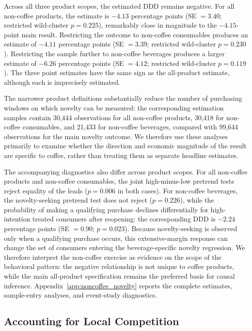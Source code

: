 \documentclass[11 pt]{article}
\begin{document}
Across all three product scopes, the estimated DDD remains negative. For all non-coffee products, the estimate is $-4.13$ percentage points (SE $=3.40$; restricted wild-cluster $p=0.225$), remarkably close in magnitude to the $-4.15$-point main result. Restricting the outcome to non-coffee consumables produces an estimate of $-4.11$ percentage points (SE $=3.39$; restricted wild-cluster $p=0.230$). Restricting the sample further to non-coffee beverages produces a larger estimate of $-6.26$ percentage points (SE $=4.12$; restricted wild-cluster $p=0.119$). The three point estimates have the same sign as the all-product estimate, although each is imprecisely estimated.

The narrower product definitions substantially reduce the number of purchasing windows on which novelty can be measured: the corresponding estimation samples contain 30,444 observations for all non-coffee products, 30,418 for non-coffee consumables, and 21,433 for non-coffee beverages, compared with 99,644 observations for the main novelty outcome. We therefore use these analyses primarily to examine whether the direction and economic magnitude of the result are specific to coffee, rather than treating them as separate headline estimates.

The accompanying diagnostics also differ across product scopes. For all non-coffee products and non-coffee consumables, the joint high-minus-low pretrend tests reject equality of the leads ($p=0.006$ in both cases). For non-coffee beverages, the novelty-seeking pretrend test does not reject ($p=0.226$), while the probability of making a qualifying purchase declines differentially for high-intention treated consumers after reopening: the corresponding DDD is $-2.24$ percentage points (SE $=0.90$; $p=0.023$). Because novelty-seeking is observed only when a qualifying purchase occurs, this extensive-margin response can change the set of consumers entering the beverage-specific novelty regression. We therefore interpret the non-coffee exercise as evidence on the scope of the behavioral pattern: the negative relationship is not unique to coffee products, while the main all-product specification remains the preferred basis for causal inference. Appendix~\ref{app:noncoffee_novelty} reports the complete estimates, sample-entry analyses, and event-study diagnostics.

\subsection{Accounting for Local Competition}
\label{section:robustness_competing_brands}
\end{document}
